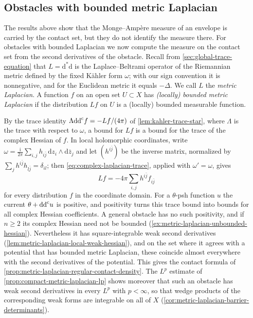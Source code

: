\subsection{Obstacles with bounded metric Laplacian}
\label{sec:metric-laplacian-obstacles}
The results above show that the Monge--Amp\`ere measure of an envelope is carried by the contact set, but they do not identify the measure there. For obstacles with bounded Laplacian we now compute the measure on the contact set from the second derivatives of the obstacle. Recall from \cref{sec:global-trace-equation} that $L=\mathrm d^*\mathrm d$ is the Laplace--Beltrami operator of the Riemannian metric defined by the fixed K\"ahler form $\omega$; with our sign convention it is nonnegative, and for the Euclidean metric it equals $-\Delta$. We call $L$ the \emph{metric Laplacian}. A function $f$ on an open set $U\subset X$ has \emph{(locally) bounded metric Laplacian} if the distribution $Lf$ on $U$ is a (locally) bounded measurable function.

By the trace identity $\Lambda\mathrm{dd}^{\mathrm{c}} f=-Lf/(4\pi)$ of \cref{lem:kahler-trace-star}, where $\Lambda$ is the trace with respect to $\omega$, a bound for $Lf$ is a bound for the trace of the complex Hessian of $f$. In local holomorphic coordinates, write $\omega=\frac{\mathrm i}{2\pi}\sum_{i,j}h_{i\bar j}\,\mathrm dz_i\wedge\mathrm d\bar z_j$ and let $(h^{i\bar j})$ be the inverse matrix, normalized by $\sum_jh^{i\bar j}h_{l\bar j}=\delta_{il}$; then \eqref{eq:complex-laplacian-trace}, applied with $\omega'=\omega$, gives
\begin{equation}\label{eq:metric-laplacian-coordinates}
 Lf=-4\pi\sum_{i,j}h^{i\bar j}f_{i\bar j}
\end{equation}
for every distribution $f$ in the coordinate domain. For a $\theta$-psh function $u$ the current $\theta+\mathrm{dd}^{\mathrm{c}} u$ is positive, and positivity turns this trace bound into bounds for all complex Hessian coefficients. A general obstacle has no such positivity, and if $n\geq2$ its complex Hessian need not be bounded (\cref{ex:metric-laplacian-unbounded-hessian}). Nevertheless it has square-integrable weak second derivatives (\cref{lem:metric-laplacian-local-weak-hessian}), and on the set where it agrees with a potential that has bounded metric Laplacian, these coincide almost everywhere with the second derivatives of the potential. This gives the contact formula of \cref{prop:metric-laplacian-regular-contact-density}. The $L^p$ estimate of \cref{prop:compact-metric-laplacian-lp} shows moreover that such an obstacle has weak second derivatives in every $L^p$ with $p<\infty$, so that wedge products of the corresponding weak forms are integrable on all of $X$ (\cref{cor:metric-laplacian-barrier-determinants}).

